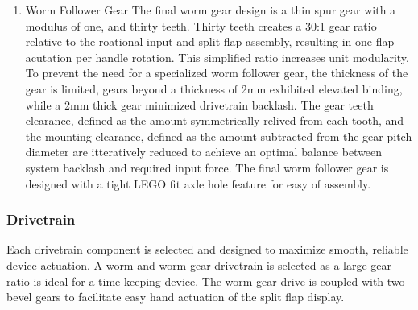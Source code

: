\documentclass[11pt]{article}
\begin{document}
\begin{enumerate}
\item Worm Follower Gear
\label{sec:orga0bf3bc}
The final worm gear design is a thin spur gear with a modulus of one, and thirty teeth. Thirty teeth creates a 30:1 gear ratio relative to the roational input and split flap assembly, resulting in one flap acutation per handle rotation. This simplified ratio increases unit modularity. To prevent the need for a specialized worm follower gear, the thickness of the gear is limited, gears beyond a thickness of 2mm exhibited elevated binding, while a 2mm thick gear minimized drivetrain backlash. The gear teeth clearance, defined as the amount symmetrically relived from each tooth, and the mounting clearance, defined as the amount subtracted from the gear pitch diameter are itteratively reduced to achieve an optimal balance between system backlash and required input force. The final worm follower gear is designed with a tight LEGO fit axle hole feature for easy of assembly.
\end{enumerate}

\subsubsection{Drivetrain}
\label{sec:org6164106}
Each drivetrain component is selected and designed to maximize smooth, reliable device actuation. A worm and worm gear drivetrain is selected as a large gear ratio is ideal for a time keeping device. The worm gear drive is coupled with two bevel gears to facilitate easy hand actuation of the split flap display.
\end{document}
